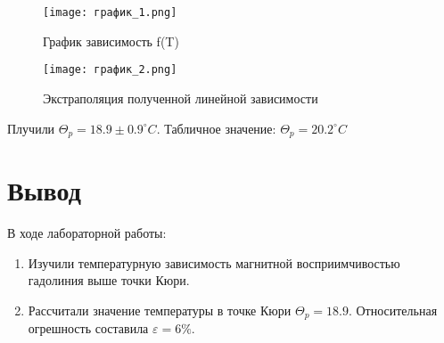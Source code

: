 \documentclass[12pt,a4paper]{article}
\begin{document}
\begin{enumerate}
\begin{figure}[H]
    \begin{center}
    \texttt{[image: график\_1.png]}
    \caption{График зависимость f(T)}
    \label{ferrit} %
    \end{center}
\end{figure}

\begin{figure}[H]
    \begin{center}
    \texttt{[image: график\_2.png]}
    \caption{Экстраполяция полученной линейной зависимости}
    \label{pe} %
    \end{center}
\end{figure}
    
\end{enumerate}
Плучили $\Theta_p = 18.9 \pm 0.9 ^\circ C$. 
Табличное значение: $\Theta_p = 20.2 ^\circ C$
\section{Вывод}

В ходе лабораторной работы:
\begin{enumerate}
    \item Изучили температурную зависимость магнитной восприимчивостью гадолиния выше точки Кюри.
    \item Рассчитали значение температуры в точке Кюри $\Theta_p = 18.9$. Относительная огрешность составила $\varepsilon =  6\%$.
\end{enumerate}
\newpage
\end{document}
